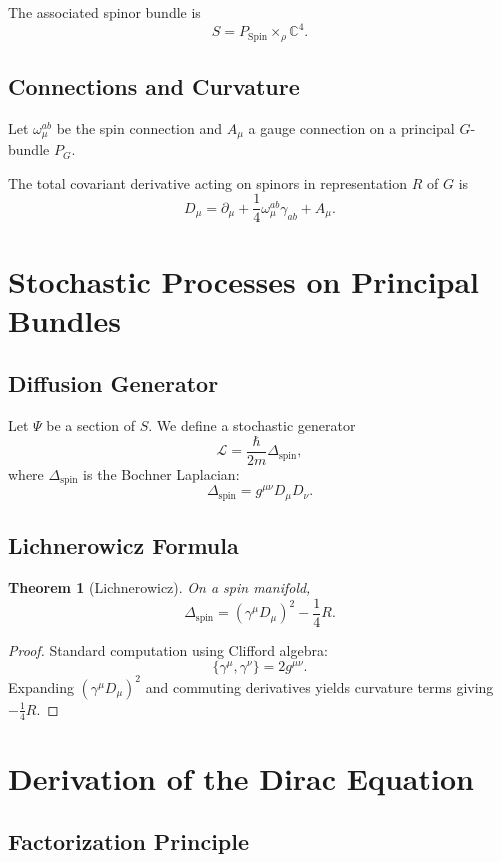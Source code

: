 \documentclass[11pt]{article}
\newtheorem{theorem}{Theorem}[section]
\theoremstyle{remark}
\newcommand{\C}{\mathbb{C}}
\newcommand{\Spin}{\mathrm{Spin}}
\begin{document}
The associated spinor bundle is
\[
S = P_{\Spin} \times_{\rho} \C^4.
\]

\subsection{Connections and Curvature}

Let $\omega_\mu^{ab}$ be the spin connection and $A_\mu$ a gauge connection on a principal $G$-bundle $P_G$.

The total covariant derivative acting on spinors in representation $R$ of $G$ is
\[
D_\mu = \partial_\mu + \frac{1}{4}\omega_\mu^{ab}\gamma_{ab} + A_\mu.
\]

\section{Stochastic Processes on Principal Bundles}

\subsection{Diffusion Generator}

Let $\Psi$ be a section of $S$. 
We define a stochastic generator
\[
\mathcal{L} = \frac{\hbar}{2m}\Delta_{\text{spin}},
\]
where $\Delta_{\text{spin}}$ is the Bochner Laplacian:
\[
\Delta_{\text{spin}} = g^{\mu\nu} D_\mu D_\nu.
\]

\subsection{Lichnerowicz Formula}

\begin{theorem}[Lichnerowicz]
On a spin manifold,
\[
\Delta_{\text{spin}} = (\gamma^\mu D_\mu)^2 - \frac{1}{4}R.
\]
\end{theorem}

\begin{proof}
Standard computation using Clifford algebra:
\[
\{\gamma^\mu,\gamma^\nu\}=2g^{\mu\nu}.
\]
Expanding $(\gamma^\mu D_\mu)^2$ and commuting derivatives yields curvature terms giving $-\frac14 R$.
\end{proof}

\section{Derivation of the Dirac Equation}

\subsection{Factorization Principle}
\end{document}
